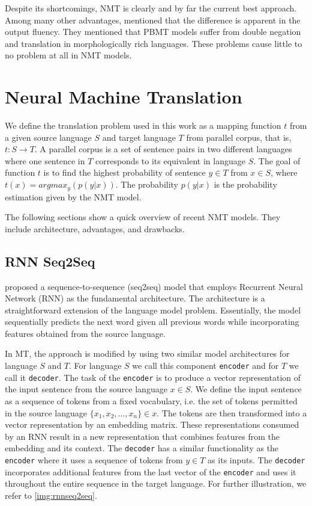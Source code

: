 Despite its shortcomings, NMT is clearly and by far the current best approach. Among many other advantages,  mentioned that the difference is apparent in the output fluency. They mentioned that PBMT models suffer from double negation and translation in morphologically rich languages. These problems cause little to no problem at all in NMT models.

\section{Neural Machine Translation}
\label{sec:bm_nmt}
We define the translation problem used in this work as a mapping function $t$ from a given source language $S$ and target language $T$ from parallel corpus, that is, $t : S \rightarrow T$. A parallel corpus is a set of sentence pairs in two different languages where one sentence in $T$ corresponds to its equivalent in language $S$. The goal of function $t$ is to find the highest probability of sentence $y \in T$ from $x \in S$, where $t(x) = argmax_y(p(y|x))$. The probability $p(y|x)$ is the probability estimation given by the NMT model.

The following sections show a quick overview of recent NMT models. They include architecture, advantages, and drawbacks.

\subsection{RNN Seq2Seq}
 proposed a sequence-to-sequence (seq2seq) model that employs Recurrent Neural Network (RNN) as the fundamental architecture. The architecture is a straightforward extension of the language model problem. Essentially, the model sequentially predicts the next word given all previous words while incorporating features obtained from the source language.

In MT, the approach is modified by using two similar model architectures for language $S$ and $T$. For language $S$ we call this component \texttt{encoder} and for $T$ we call it \texttt{decoder}.
The task of the \texttt{encoder} is to produce a vector representation of the input sentence from the source language $x \in S$. We define the input sentence as a sequence of tokens from a fixed vocabulary, i.e. the set of tokens permitted in the source language $\{x_1, x_2, ..., x_n\} \in x$. The tokens are then transformed into a vector representation by an embedding matrix. These representations consumed by an RNN result in a new representation that combines features from the embedding and its context. The \texttt{decoder} has a similar functionality as the \texttt{encoder} where it uses a sequence of tokens from $y \in T$ as its inputs. The \texttt{decoder} incorporates additional features from the last vector of the \texttt{encoder} and uses it throughout the entire sequence in the target language. For further illustration, we refer to \cref{img:rnnseq2seq}.

